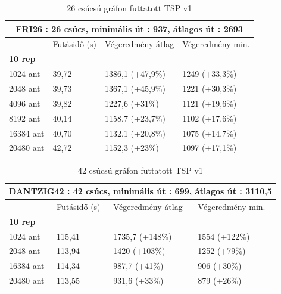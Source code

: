 \begin{table}[ht!]
	\centering
	\begin{tabular}{|p{2cm}||p{3cm}|p{3.5cm}|p{3.5cm}|}
		\hline
		\multicolumn{4}{|c|}{FRI26 : 26 csúcs, minimális út : 937, átlagos út : 2693} \\
		\hline
		& Futásidő (s) & Végeredmény átlag & Végeredmény min.\\
		\hline
		\textbf{10 rep} & & & \\
		1024 ant & 39,72 & 1386,1 (+47,9\%) & 1249 (+33,3\%)\\
		2048 ant & 39,73 & 1367,1 (+45,9\%) & 1221 (+30,3\%) \\
		4096 ant & 39,82 & 1227,6 (+31\%) & 1121 (+19,6\%) \\
		8192 ant & 40,14 & 1158,7 (+23,7\%) & 1102 (+17,6\%) \\
		16384 ant & 40,70 & 1132,1 (+20,8\%) & 1075 (+14,7\%) \\
		20480 ant & 42,72 & 1152,3 (+23\%) & 1097 (+17,1\%) \\
		\hline
	\end{tabular}
	\caption{26 csúcsú gráfon futtatott TSP v1}
	\label{table:TSPv1_26}
\end{table}

\begin{table}[ht!]
	\centering
	\begin{tabular}{|p{2cm}||p{3cm}|p{3.5cm}|p{3.5cm}|}
		\hline
		\multicolumn{4}{|c|}{DANTZIG42 : 42 csúcs, minimális út : 699, átlagos út : 3110,5} \\
		\hline
		& Futásidő (s) & Végeredmény átlag & Végeredmény min.\\
		\hline
		\textbf{10 rep} & & & \\
		1024 ant & 115,41 & 1735,7 (+148\%) & 1554 (+122\%) \\
		2048 ant & 113,94 & 1420 (+103\%) & 1252 (+79\%) \\
		16384 ant & 114,34 & 987,7 (+41\%) & 906 (+30\%) \\
		20480 ant & 113,55 & 931,6 (+33\%) & 879 (+26\%) \\
		\hline
	\end{tabular}
	\caption{42 csúcsú gráfon futtatott TSP v1}
	\label{table:TSPv1_42}
\end{table}

